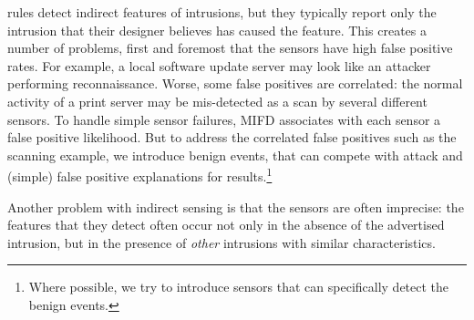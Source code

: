 \ids rules detect indirect features of intrusions, but they typically
report only the intrusion that their designer believes has caused the feature.
This creates a number of problems, first and foremost that the
sensors have high false positive rates.
For example, a local software update server
may look like an attacker performing reconnaissance.
Worse, some false positives are correlated: the normal
activity of a print server may be mis-detected as a scan by several
different sensors.
To handle simple sensor failures, MIFD associates with each sensor a false
positive likelihood.
But to address the correlated false positives such as the scanning example, we
introduce benign events, that can compete with attack and (simple) false
positive explanations for results.\footnote{Where possible, we try to introduce sensors that
can specifically detect the benign events. 
}

Another problem with indirect sensing is that the sensors are often imprecise:
the features that they detect often occur not only in the absence of the
advertised intrusion, but in the presence of \emph{other} intrusions with
similar characteristics.


